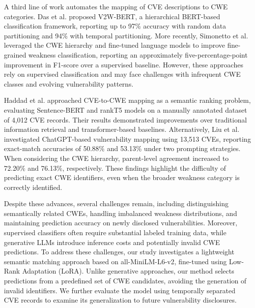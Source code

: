\documentclass[conference,compsoc]{IEEEtran}
\begin{document}
A third line of work automates the mapping of CVE descriptions to CWE categories. Das et al. \cite{das2021v2w} proposed V2W-BERT,
a hierarchical BERT-based classification framework,
reporting up to 97\% accuracy with random data partitioning and 94\% with temporal partitioning. More recently, Simonetto et al. \cite{simonetto2026knowing} leveraged the CWE hierarchy and fine-tuned language models to improve fine-grained weakness classification, reporting an approximately five-percentage-point improvement in F1-score over a supervised baseline. However, these approaches rely on supervised classification and may face challenges with infrequent CWE classes and evolving vulnerability patterns.

Haddad et al. \cite{haddad2023automated} approached CVE-to-CWE mapping as a semantic ranking problem,
evaluating Sentence-BERT and rankT5 models on a
manually annotated dataset of 4,012 CVE records.
Their results demonstrated improvements over traditional information retrieval and transformer-based baselines.
Alternatively, Liu et al. \cite{liu2023not} investigated ChatGPT-based vulnerability mapping using 13,513 CVEs, reporting exact-match accuracies of 50.88\% and 53.13\% under two prompting strategies. When considering the CWE hierarchy, parent-level agreement increased to 72.20\% and 76.13\%, respectively. These findings highlight the difficulty of predicting exact CWE identifiers, even when the broader weakness category is correctly identified.

Despite these advances, several challenges remain,
including distinguishing semantically related CWEs,
handling imbalanced weakness distributions, and
maintaining prediction accuracy on newly disclosed
vulnerabilities. Moreover, supervised classifiers
often require substantial labeled training data,
while generative LLMs introduce inference costs and
potentially invalid CWE predictions. To address these
challenges, our study investigates a lightweight
semantic matching approach based on all-MiniLM-L6-v2,
fine-tuned using Low-Rank Adaptation (LoRA). Unlike
generative approaches, our method selects predictions
from a predefined set of CWE candidates, avoiding
the generation of invalid identifiers. We further
evaluate the model using temporally separated CVE
records to examine its generalization to future
vulnerability disclosures. 

\end{document}
